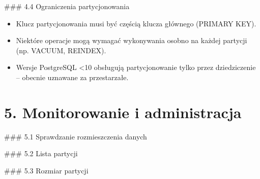 \documentclass[a4paper,11pt,polish]{sphinxmanual}
\begin{document}
\sphinxAtStartPar
\#\#\# 4.4 Ograniczenia partycjonowania
\begin{itemize}
\item {} 
\sphinxAtStartPar
Klucz partycjonowania musi być częścią klucza głównego (PRIMARY KEY).

\item {} 
\sphinxAtStartPar
Niektóre operacje mogą wymagać wykonywania osobno na każdej partycji (np. VACUUM, REINDEX).

\item {} 
\sphinxAtStartPar
Wersje PostgreSQL <10 obsługują partycjonowanie tylko przez dziedziczenie – obecnie uznawane za przestarzałe.

\end{itemize}


\section{5. Monitorowanie i administracja}
\label{\detokenize{rozdzial_1:monitorowanie-i-administracja}}
\sphinxAtStartPar
\#\#\# 5.1 Sprawdzanie rozmieszczenia danych

\begin{sphinxVerbatim}[commandchars=\\\{\}]
\end{sphinxVerbatim}

\sphinxAtStartPar
\#\#\# 5.2 Lista partycji

\begin{sphinxVerbatim}[commandchars=\\\{\}]
\end{sphinxVerbatim}

\sphinxAtStartPar
\#\#\# 5.3 Rozmiar partycji

\begin{sphinxVerbatim}[commandchars=\\\{\}]
\end{sphinxVerbatim}
\end{document}
